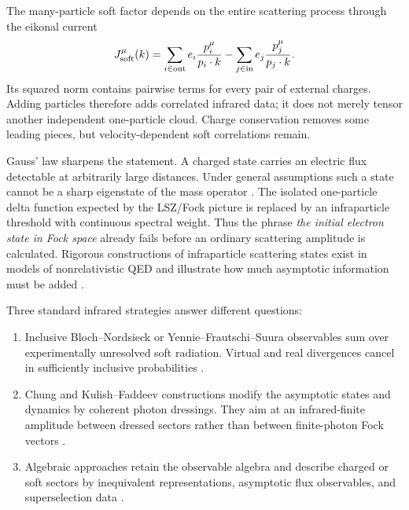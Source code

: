 The many-particle soft factor depends on the entire scattering process through
the eikonal current
\begin{equation}
  J_{\mathrm{soft}}^\mu(k)
  =
  \sum_{i\in\mathrm{out}}
  e_i\frac{p_i^\mu}{p_i\cdot k}
  -
  \sum_{j\in\mathrm{in}}
  e_j\frac{p_j^\mu}{p_j\cdot k}.
  \label{eq:eikonal-soft-current}
\end{equation}
Its squared norm contains pairwise terms for every pair of external charges.
Adding particles therefore adds correlated infrared data; it does not merely
tensor another independent one-particle cloud.  Charge conservation removes
some leading pieces, but velocity-dependent soft correlations remain.

Gauss' law sharpens the statement.  A charged state carries an electric flux
detectable at arbitrarily large distances.  Under general assumptions such a
state cannot be a sharp eigenstate of the mass operator
\cite{Buchholz:1986}.  The isolated one-particle delta function expected by
the LSZ/Fock picture is replaced by an infraparticle threshold with continuous
spectral weight.  Thus the phrase \textit{the initial electron state in Fock
space} already fails before an ordinary scattering amplitude is calculated.
Rigorous constructions of infraparticle scattering states exist in models of
nonrelativistic QED and illustrate how much asymptotic information must be
added \cite{ChenFrohlichPizzo:2010}.

Three standard infrared strategies answer different questions:
\begin{enumerate}
  \item Inclusive Bloch--Nordsieck or Yennie--Frautschi--Suura observables sum
  over experimentally unresolved soft radiation.  Virtual and real
  divergences cancel in sufficiently inclusive probabilities
  \cite{YennieFrautschiSuura:1961}.

  \item Chung and Kulish--Faddeev constructions modify the asymptotic states
  and dynamics by coherent photon dressings.  They aim at an infrared-finite
  amplitude between dressed sectors rather than between finite-photon Fock
  vectors \cite{Chung:1965,KulishFaddeev:1970}.

  \item Algebraic approaches retain the observable algebra and describe
  charged or soft sectors by inequivalent representations, asymptotic flux
  observables, and superselection data \cite{Haag:1996,Buchholz:1986}.
\end{enumerate}

